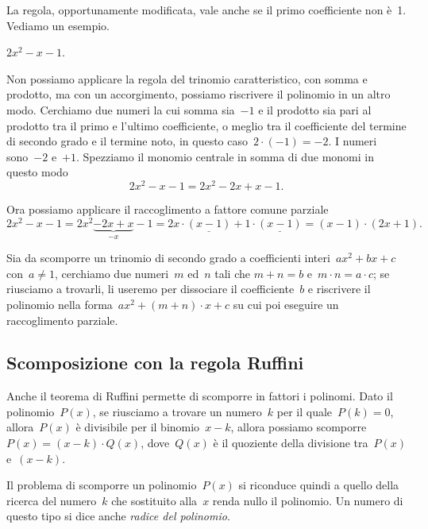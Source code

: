 La regola, opportunamente modificata, vale anche se il primo
coefficiente non è~1. Vediamo un esempio.
\pagebreak
\begin{exrig}
 \begin{esempio}
 $2x^{2}-x-1$.

Non possiamo applicare la regola del trinomio caratteristico, con somma
e prodotto, ma con un accorgimento, possiamo riscrivere il polinomio in un
altro modo. Cerchiamo due numeri la cui somma sia~$-1$ e il prodotto sia
pari al prodotto tra il primo e l'ultimo coefficiente,
o meglio tra il coefficiente del termine di secondo grado e il termine
noto, in questo caso~$2\cdot (-1)=-2$. I numeri sono~$-2$ e~$+1$.
Spezziamo il monomio centrale in somma di due monomi in questo modo
\[2x^{2}-x-1=2x^{2}-2x+x-1.\]

Ora possiamo applicare il raccoglimento a fattore comune parziale
\[2x^{2}-x-1={2x^{2}}\underbrace{{-2x}+x}_{-x}-1=2x\cdot
\underline{(x-1)}+1\cdot
\underline{(x-1)}=\left(x-1\right)\cdot \left(2x+1\right).\]
 \end{esempio}
\end{exrig}

\begin{procedura}
Sia da scomporre un trinomio di secondo grado a coefficienti interi~$ax^{2}+bx+c$
con~$a\neq 1$, cerchiamo due numeri~$m$ ed~$n$ tali che $m+n=b$ e~$m\cdot n=a\cdot c$;
se riusciamo a trovarli, li useremo per dissociare
il coefficiente~$b$ e riscrivere il polinomio nella forma~$ax^{2}+\left(m+n\right)\cdot x+c$
su cui poi eseguire un raccoglimento parziale.
\end{procedura}

\ovalbox{\risolvii \ref{ese:13.57}, \ref{ese:13.58}, \ref{ese:13.59}, \ref{ese:13.60}, \ref{ese:13.61}, \ref{ese:13.62}, \ref{ese:13.63}, \ref{ese:13.64}, \ref{ese:13.65}, \ref{ese:13.66}}

\subsection{Scomposizione con la regola Ruffini}
Anche il teorema di Ruffini permette di scomporre in fattori i polinomi.
Dato il polinomio~$P(x)$, se riusciamo a trovare un numero~$k$
per il quale~$P(k)=0$, allora~$P(x)$ è
divisibile per il binomio~$x-k$, allora possiamo scomporre~$P(x)=(x-k)\cdot Q(x)$, dove~$Q(x)$
è il quoziente della divisione
tra~$P(x)$ e~$(x-k)$.

Il problema di scomporre un polinomio~$P(x)$ si riconduce quindi a quello
della ricerca del numero~$k$ che sostituito alla~$x$ renda nullo il
polinomio. Un numero di questo tipo si dice anche \emph{radice del polinomio}.

